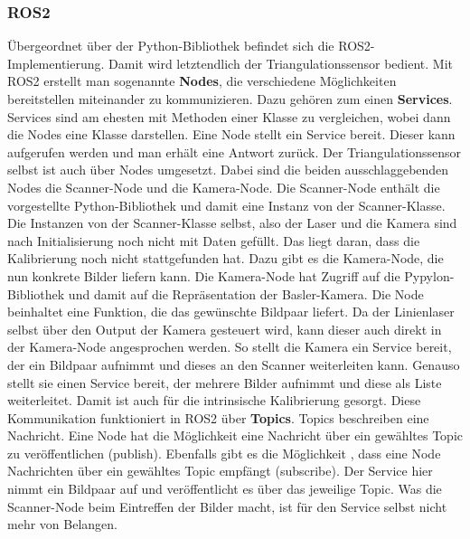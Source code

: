 		\subsubsection{ROS2}
		
		Übergeordnet über der Python-Bibliothek befindet sich die ROS2-Implementierung. Damit wird letztendlich der Triangulationssensor bedient. Mit ROS2 erstellt man sogenannte \textbf{Nodes}, die verschiedene Möglichkeiten bereitstellen miteinander zu kommunizieren. Dazu gehören zum einen \textbf{Services}. Services sind am ehesten mit Methoden einer Klasse zu vergleichen, wobei dann die Nodes eine Klasse darstellen. Eine Node stellt ein Service bereit. Dieser kann aufgerufen werden und man erhält eine Antwort zurück. Der Triangulationssensor selbst ist auch über Nodes umgesetzt. Dabei sind die beiden ausschlaggebenden Nodes die Scanner-Node und die Kamera-Node. Die Scanner-Node enthält die vorgestellte Python-Bibliothek und damit eine Instanz von der Scanner-Klasse. Die Instanzen von der Scanner-Klasse selbst, also der Laser und die Kamera sind nach Initialisierung noch nicht mit Daten gefüllt. Das liegt daran, dass die Kalibrierung noch nicht stattgefunden hat. Dazu gibt es die Kamera-Node, die nun konkrete Bilder liefern kann. Die Kamera-Node hat Zugriff auf die Pypylon-Bibliothek und damit auf die Repräsentation der Basler-Kamera. Die Node beinhaltet eine Funktion, die das gewünschte Bildpaar liefert. Da der Linienlaser selbst über den Output der Kamera gesteuert wird, kann dieser auch direkt in der Kamera-Node angesprochen werden. So stellt die Kamera ein Service bereit, der ein Bildpaar aufnimmt und dieses an den Scanner weiterleiten kann. Genauso stellt sie einen Service bereit, der mehrere Bilder aufnimmt und diese als Liste weiterleitet. Damit ist auch für die intrinsische Kalibrierung gesorgt. \newline
		Diese Kommunikation funktioniert in ROS2 über \textbf{Topics}. Topics beschreiben eine Nachricht. Eine Node hat die Möglichkeit eine Nachricht über ein gewähltes Topic zu veröffentlichen (publish). Ebenfalls gibt es die Möglichkeit , dass eine Node Nachrichten über ein gewähltes Topic empfängt (subscribe). Der Service hier nimmt ein Bildpaar auf und veröffentlicht es über das jeweilige Topic. Was die Scanner-Node beim Eintreffen der Bilder macht, ist für den Service selbst nicht mehr von Belangen.\newline
